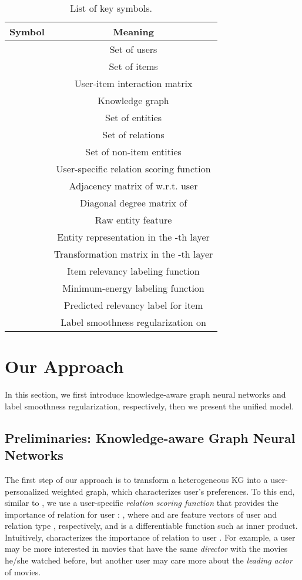 \documentclass[sigconf]{acmart}
\begin{document}
	\begin{table}[b]
		\vspace{-0.1in}
		\centering
		\setlength{\tabcolsep}{4pt}
		\begin{tabular}{c|c}
			\hline
			Symbol & Meaning \\
			\hline
			 & Set of users \\
			 & Set of items \\
			 & User-item interaction matrix \\
			 & Knowledge graph \\
			 & Set of entities \\
			 & Set of relations \\
			 & Set of non-item entities \\
			 & User-specific relation scoring function \\
			 & Adjacency matrix of  w.r.t. user  \\
			 & Diagonal degree matrix of  \\
			 & Raw entity feature \\
			 & Entity representation in the -th layer \\
			 & Transformation matrix in the -th layer \\
			 & Item relevancy labeling function \\
			 & Minimum-energy labeling function \\
			 & Predicted relevancy label for item  \\
			 & Label smoothness regularization on  \\
			\hline
		\end{tabular}
		\vspace{0.05in}
		\caption{List of key symbols.}
		\label{table:notation}
		\vspace{-0.15in}
	\end{table}
		
	
	
	
\section{Our Approach}
	In this section, we first introduce knowledge-aware graph neural networks and label smoothness regularization, respectively, then we present the unified model.
	
	\subsection{Preliminaries: Knowledge-aware Graph Neural Networks}
		The first step of our approach is to transform a heterogeneous KG into a user-personalized weighted graph, which characterizes user's preferences.
		To this end, similar to \cite{wang2019knowledge}, we use a user-specific \textit{relation scoring function}  that provides the importance of relation  for user : , where  and  are feature vectors of user  and relation type , respectively, and  is a differentiable function such as inner product.
		Intuitively,  characterizes the importance of relation  to user .
		For example, a user may be more interested in movies that have the same \textit{director} with the movies he/she watched before, but another user may care more about the \textit{leading actor} of movies.
		
\end{document}
